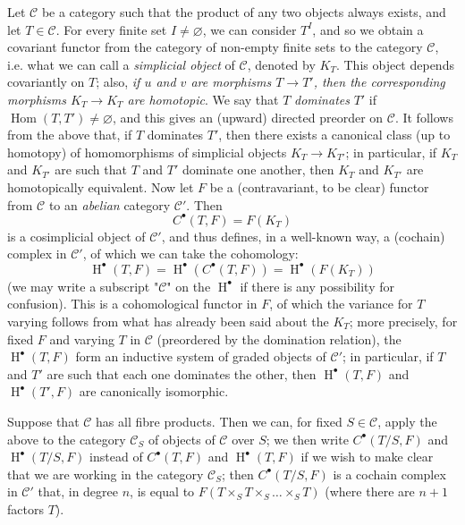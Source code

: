 \label{fga3.i-a.4.a}
Let $\mathcal{C}$ be a category such that the product of any two objects always exists, and let $T\in\mathcal{C}$.
For every finite set $I\neq\varnothing$, we can consider $T^I$, and so we obtain a covariant functor from the category of non-empty finite sets to the category $\mathcal{C}$, i.e. what we can call a \emph{simplicial object} of $\mathcal{C}$, denoted by $K_T$.
This object depends covariantly on $T$;
also, \emph{if $u$ and $v$ are morphisms $T\to T'$, then the corresponding morphisms $K_T\to K_{T}$ are homotopic}.
We say that $T$ \emph{dominates} $T'$ if $\operatorname{Hom}(T,T')\neq\varnothing$, and this gives an (upward) directed preorder on $\mathcal{C}$.
It follows from the above that, if $T$ dominates $T'$, then there exists a canonical class (up to homotopy) of homomorphisms of simplicial objects $K_T\to K_{T'}$;
in particular, if $K_T$ and $K_{T'}$ are such that $T$ and $T'$ dominate one another, then $K_T$ and $K_{T'}$ are homotopically equivalent.
Now let $F$ be a (contravariant, to be clear) functor from $\mathcal{C}$ to an \emph{abelian} category $\mathcal{C}'$.
Then
\[
    C^\bullet(T,F) = F(K_T)
\]
is a cosimplicial object of $\mathcal{C}'$, and thus defines, in a well-known way, a (cochain) complex in $\mathcal{C}'$, of which we can take the cohomology:
\[
    \operatorname{H}^\bullet(T,F)
    = \operatorname{H}^\bullet(C^\bullet(T,F))
    = \operatorname{H}^\bullet(F(K_T))
\]
(we may write a subscript "$\mathcal{C}$" on the $\operatorname{H}^\bullet$ if there is any possibility for confusion).
This is a cohomological functor in $F$, of which the variance for $T$ varying follows from what has already been said about the $K_T$;
more precisely, for fixed $F$ and varying $T$ in $\mathcal{C}$ (preordered by the domination relation), the $\operatorname{H}^\bullet(T,F)$ form an inductive system of graded objects of $\mathcal{C}'$;
in particular, if $T$ and $T'$ are such that each one dominates the other, then $\operatorname{H}^\bullet(T,F)$ and $\operatorname{H}^\bullet(T',F)$ are canonically isomorphic.

Suppose that $\mathcal{C}$ has all fibre products.
Then we can, for fixed $S\in\mathcal{C}$, apply the above to the category $\mathcal{C}_S$ of objects of $\mathcal{C}$ over $S$;
we then write $C^\bullet(T/S,F)$ and $\operatorname{H}^\bullet(T/S,F)$ instead of $C^\bullet(T,F)$ and $\operatorname{H}^\bullet(T,F)$ if we wish to make clear that we are working in the category $\mathcal{C}_S$;
then $C^\bullet(T/S,F)$ is a cochain complex in $\mathcal{C}'$ that, in degree $n$, is equal to $F(T\times_S T\times_S\ldots\times_S T)$ (where there are $n+1$ factors $T$).



